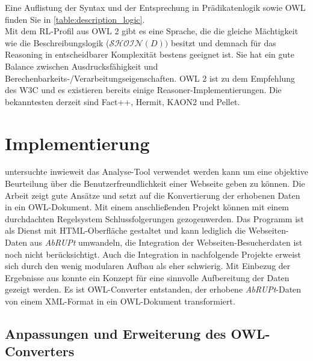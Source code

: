 \documentclass[runningheads,a4paper]{llncs}
\begin{document}
Eine Auflistung der Syntax und der Entsprechung in Prädikatenlogik sowie OWL finden Sie in \ref{table:description_logic}.
\\
Mit dem RL-Profil aus OWL 2 \cite{owl2rl} gibt es eine Sprache, die die gleiche Mächtigkeit wie die Beschreibungslogik (\(\mathcal{SHOIN}(D))\) besitzt und demnach für das Reasoning in entscheidbarer Komplexität bestens geeignet ist.
Sie hat ein gute Balance zwischen Ausdrucksfähigkeit und Berechenbarkeits-/Verarbeitungseigenschaften.
OWL 2 ist zu dem Empfehlung des W3C und es existieren bereits einige Reasoner-Implementierungen. 
Die bekanntesten derzeit sind Fact++, Hermit, KAON2 und Pellet.


\section{Implementierung}
\label{sec:implementation}

\cite{Brieger} untersuchte inwieweit das Analyse-Tool \cite{abrupt} verwendet werden kann um eine objektive Beurteilung über die Benutzerfreundlichkeit einer Webseite geben zu können. 
Die Arbeit zeigt gute Ansätze und setzt auf die Konvertierung der erhobenen Daten in ein OWL-Dokument. 
Mit einem anschließenden Projekt können mit einem durchdachten Regelsystem Schlussfolgerungen gezogenwerden. 
Das Programm ist als Dienst mit HTML-Oberfläche gestaltet und kann lediglich die Webseiten-Daten aus \textit{AbRUPt} umwandeln, die Integration der Webseiten-Besucherdaten ist noch nicht berücksichtigt. 
Auch die Integration in nachfolgende Projekte erweist sich durch den wenig modularen Aufbau als eher schwierig. 
Mit Einbezug der Ergebnisse aus \cite{Martin} konnte ein Konzept für eine sinnvolle Aufbereitung der Daten gezeigt werden. 
Es ist OWL-Converter entstanden, der erhobene \textit{AbRUPt}-Daten von einem XML-Format in ein OWL-Dokument transformiert.

\subsection{Anpassungen und Erweiterung des OWL-Converters}
\label{sec:customization}
\end{document}
